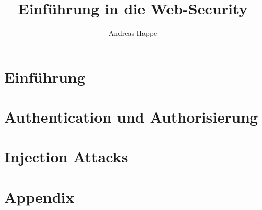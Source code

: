 \documentclass[letterpaper]{kdp}
\title{Einführung in die Web-Security}
\author{Andreas Happe}
\begin{document}

\tableofcontents %

\cleardoublepage %



\mainmatter

\part{Einführung}











\part{Authentication und Authorisierung}









\part{Injection Attacks}







\appendix

\part{Appendix}





\end{document}
